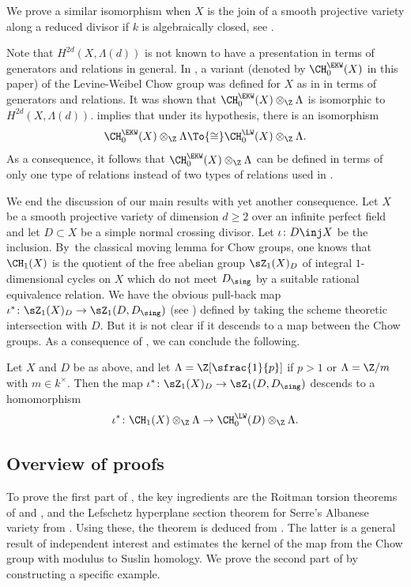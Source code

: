 We prove a similar isomorphism when $X$ is the join of a smooth
projective variety along a reduced divisor if $k$ is algebraically closed,
see .

Note that $H^{2d}(X, \Lambda(d))$ is not known to have a presentation in terms
of generators and relations in general. In \cite[Th.\,7.1]{EKW},
a variant (denoted by $\CH^{\EKW}_0(X)$ in this paper)
of the Levine-Weibel Chow group
was defined for $X$ as in 
in terms of generators and relations. It was shown that
$\CH^{\EKW}_0(X) \otimes_{\Z} \Lambda$ is isomorphic to $H^{2d}(X, \Lambda(d))$.
 implies that under its hypothesis, there is an isomorphism
\[
\CH^{\EKW}_0(X) \otimes_{\Z} \Lambda \To{\cong} \CH^{\LW}_0(X) \otimes_{\Z} \Lambda.
\]
As a consequence, it follows that $\CH^{\EKW}_0(X) \otimes_{\Z} \Lambda$
can be defined in terms
of only one type of relations instead of two types of relations used in
\cite{EKW}.

We end the discussion of our main results with yet another consequence.
Let $X$ be a smooth projective variety of dimension $d \ge 2$
over an infinite
perfect field and let $D \subset X$ be a simple normal crossing divisor.
Let $\iota \colon D \inj X$ be the inclusion.
By~the classical moving lemma for Chow groups, one knows that $\CH_1(X)$
is the quotient of the free abelian group $\sZ_1(X)_D$ of integral
$1$-dimensional cycles on $X$ which do not meet $D_\sing$ by a suitable
rational equivalence relation. We have the obvious pull-back map
$\iota^* \colon \sZ_1(X)_D \to \sZ_1(D, D_\sing)$
(see ) defined by taking the
scheme theoretic intersection with $D$. But it is not clear if
it descends to a map between the Chow groups.
As a consequence of , we can conclude the following.

\begin{cor}\label{cor:Main-8}Let $X$ and $D$ be as above, and let $\Lambda = \Z[\sfrac{1}{p}]$ if $p>1$ or $\Lambda = {\Z}/m$ with $m \in k^{\times}$. Then
the map $\iota^* \colon \sZ_1(X)_D \to \sZ_1(D, D_\sing)$ descends to a
homomorphism
\[
\iota^* \colon \CH_1(X) \otimes_{\Z} \Lambda \to \CH^{\LW}_0(D)\otimes_{\Z} \Lambda.
\]
\end{cor}

\subsection{Overview of proofs}\label{sec:proofs}
To prove the first part of , the key ingredients are the Roitman
torsion theorems of \cite{Krishna-2} and \cite{SS}, and the Lefschetz hyperplane
section theorem for Serre's Albanese variety from \cite{GK-1}.
Using these, the theorem is deduced from .
The latter is a general result of independent interest and estimates the kernel
of the map from the Chow group with modulus to Suslin homology.
We prove the second part of  by constructing a specific example.

